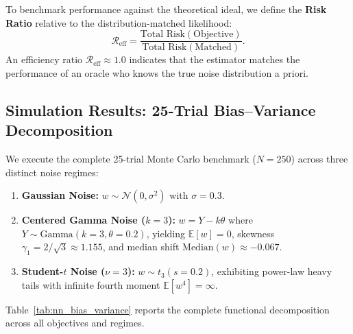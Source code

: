 To benchmark performance against the theoretical ideal, we define the \textbf{Risk Ratio} relative to the distribution-matched likelihood:
\begin{equation}
  \mathcal{R}_{\text{eff}} = \frac{\text{Total Risk}(\text{Objective})}{\text{Total Risk}(\text{Matched})}.
\end{equation}
An efficiency ratio $\mathcal{R}_{\text{eff}} \approx 1.0$ indicates that the estimator matches the performance of an oracle who knows the true noise distribution a priori.

\subsection{Simulation Results: 25-Trial Bias--Variance Decomposition}
\label{sec:nn_sim_results}

We execute the complete 25-trial Monte Carlo benchmark ($N=250$) across three distinct noise regimes:
\begin{enumerate}
  \item \textbf{Gaussian Noise:} $w \sim \mathcal{N}(0, \sigma^2)$ with $\sigma = 0.3$.
  \item \textbf{Centered Gamma Noise ($k=3$):} $w = Y - k\theta$ where $Y \sim \text{Gamma}(k=3, \theta=0.2)$, yielding $\mathbb{E}[w] = 0$, skewness $\gamma_1 = 2/\sqrt{3} \approx 1.155$, and median shift $\text{Median}(w) \approx -0.067$.
  \item \textbf{Student-$t$ Noise ($\nu=3$):} $w \sim t_3(s=0.2)$, exhibiting power-law heavy tails with infinite fourth moment $\mathbb{E}[w^4] = \infty$.
\end{enumerate}

Table~\ref{tab:nn_bias_variance} reports the complete functional decomposition across all objectives and regimes.

